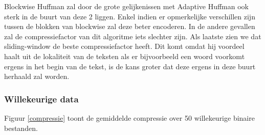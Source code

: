 \documentclass[twoside,twocolumn]{article}
\begin{document}
            Blockwise Huffman zal door de grote gelijkenissen met Adaptive Huffman ook sterk in de buurt van deze 2 liggen. Enkel indien er opmerkelijke verschillen zijn tussen de blokken van blockwise zal deze beter encoderen. In de andere gevallen zal de compressiefactor van dit algoritme iets slechter zijn. Als laatste zien we dat sliding-window de beste compressiefactor heeft. Dit komt omdat hij voordeel haalt uit de lokaliteit van de teksten als er bijvoorbeeld een woord voorkomt ergens in het begin van de tekst, is de kans groter dat deze ergens in deze buurt herhaald zal worden.
        \subsubsection{Willekeurige data}
           Figuur \ref{compressie} toont de gemiddelde compressie over 50 willekeurige binaire bestanden.
            
\end{document}

